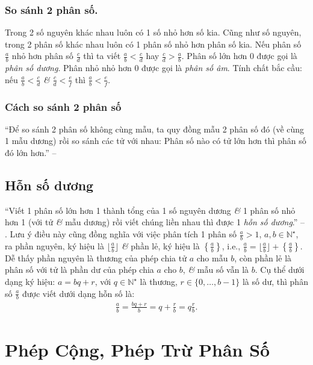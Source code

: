 \documentclass[oneside]{book}
\numberwithin{equation}{section}
\begin{document}
\subsubsection{So sánh 2 phân số.}
Trong 2 số nguyên khác nhau luôn có 1 số nhỏ hơn số kia. Cũng như số nguyên, trong 2 phân số khác nhau luôn có 1 phân số nhỏ hơn phân số kia. Nếu phân số $\frac{a}{b}$ nhỏ hơn phân số $\frac{c}{d}$ thì ta viết $\frac{a}{b} < \frac{c}{d}$ hay $\frac{c}{d} > \frac{a}{b}$. Phân số lớn hơn 0 được gọi là \emph{phân số dương}. Phân nhỏ nhỏ hơn 0 được gọi là \emph{phân số âm}. Tính chất bắc cầu: nếu $\frac{a}{b} < \frac{c}{d}$ \textit{\&} $\frac{c}{d} < \frac{e}{f}$ thì $\frac{a}{b} < \frac{e}{f}$.

\subsubsection{Cách so sánh 2 phân số}
``Để so sánh 2 phân số không cùng mẫu, ta quy đồng mẫu 2 phân số đó (về cùng 1 mẫu dương) rồi so sánh các tử với nhau: Phân số nào có tử lớn hơn thì phân số đó lớn hơn.'' -- \cite[p. 31]{Thai_Anh_Dat_Ha_Loan_Nam_Quang_Toan_6_tap_1}

\subsection{Hỗn số dương}
``Viết 1 phân số lớn hơn 1 thành tổng của 1 số nguyên dương \textit{\&} 1 phân số nhỏ hơn 1 (với tử \textit{\&} mẫu dương) rồi viết chúng liền nhau thì được 1 \emph{hỗn số dương}.'' -- \cite[p. 32]{Thai_Anh_Dat_Ha_Loan_Nam_Quang_Toan_6_tap_2}. Lưu ý điều này cũng đồng nghĩa với việc phân tích 1 phân số $\frac{a}{b} > 1$, $a,b\in\mathbb{N}^\star$, ra phần nguyên, ký hiệu là $\lfloor\frac{a}{b}\rfloor$ \textit{\&} phần lẻ, ký hiệu là $\left\{\frac{a}{b}\right\}$, i.e., $\frac{a}{b} = \lfloor\frac{a}{b}\rfloor + \left\{\frac{a}{b}\right\}$. Dễ thấy phần nguyên là thương của phép chia tử $a$ cho mẫu $b$, còn phần lẻ là phân số với tử là phần dư của phép chia $a$ cho $b$, \textit{\&} mẫu số vẫn là $b$. Cụ thể dưới dạng ký hiệu: $a = bq + r$, với $q\in\mathbb{N}^\star$ là thương, $r\in\{0,\ldots,b - 1\}$ là số dư, thì phân số $\frac{a}{b}$ được viết dưới dạng hỗn số là:
\begin{align*}
	\frac{a}{b} = \frac{bq + r}{b} = q + \frac{r}{b} = q\frac{r}{b}.
\end{align*}

\section{Phép Cộng, Phép Trừ Phân Số}
\end{document}
